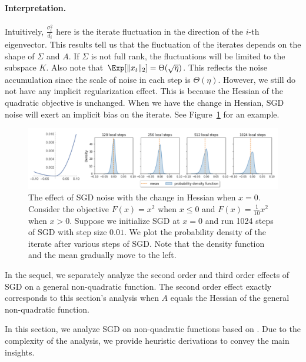 \paragraph{Interpretation.} Intuitively, $\frac{\sigma_i^2}{d_i}$ here is the iterate fluctuation in the direction of the $i$-th eigenvector. This results tell us that the fluctuation of the iterates depends on the shape of $\Sigma$ and $A$. If $\Sigma$ is not full rank, the fluctuations will be limited to the subspace $K$. Also note that $\Exp[\|x_t\|_2] = \Theta(\sqrt{\eta})$. This reflects the noise accumulation since the scale of noise in each step is $\Theta({\eta})$. However, we still do not have any implicit regularization effect. This is because the Hessian of the quadratic objective is unchanged. When we have the change in Hessian, SGD noise will exert an implicit bias on the iterate. See Figure~\ref{lec17:fig:bias} for an example.

\begin{figure}[ht]
\includegraphics[width=1.00\textwidth]{figures/bias2.png}
\centering
\caption{The effect of SGD noise with the change in Hessian when $x=0$. Consider the objective $F(x) = x^2$ when $x \le 0$ and $F(x) = \frac{1}{10}x^2$ when $x > 0$. Suppose we initialize SGD at $x=0$ and run 1024 steps of SGD with step size $0.01$. We plot the probability density of the iterate after various steps of SGD. Note that the density function and the mean gradually move to the left.} 
\label{lec17:fig:bias}
\end{figure}

In the sequel, we separately analyze the second order and third order effects of SGD on a general non-quadratic function. The second order effect exactly corresponds to this section's analysis when $A$ equals the Hessian of the general non-quadratic function.


In this section, we analyze SGD on non-quadratic functions based on \cite{damian2021label}. Due to the complexity of the analysis, we provide heuristic derivations to convey the main insights. 

